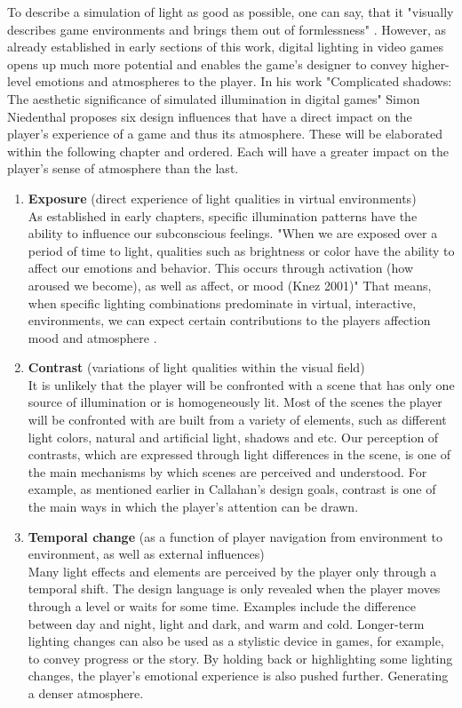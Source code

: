 To describe a simulation of light as good as possible, one can say, that it "visually describes game environments and brings them out of formlessness" \cite{Niedenthal1404353}. However, as already established in early sections of this work, digital lighting in video games opens up much more potential and enables the game's designer to convey higher-level emotions and atmospheres to the player. In his work "Complicated shadows: The aesthetic significance of simulated illumination in digital games" Simon Niedenthal proposes six design influences that have a direct impact on the player's experience of a game and thus its atmosphere. These will be elaborated within the following chapter and ordered. Each will have a greater impact on the player's sense of atmosphere than the last. 

\begin{enumerate}
    \item \textbf{Exposure} (direct experience of light qualities in virtual environments) \\
    As established in early chapters, specific illumination patterns have the ability to influence our subconscious feelings. "When we are exposed over a period of time to light, qualities such as brightness or color have the ability to affect our emotions and behavior. This occurs through activation (how aroused we become), as well as affect, or mood (Knez 2001)\cite{Knez2001}" That means, when specific lighting combinations predominate in virtual, interactive, environments, we can expect certain contributions to the players affection mood and atmosphere \cite{Shadowplay}.

    \item \textbf{Contrast} (variations of light qualities within the visual field)\\ 
    It is unlikely that the player will be confronted with a scene that has only one source of illumination or is homogeneously lit. Most of the scenes the player will be confronted with are built from a variety of elements, such as different light colors, natural and artificial light, shadows and etc. Our perception of contrasts, which are expressed through light differences in the scene, is one of the main mechanisms by which scenes are perceived and understood. For example, as mentioned earlier in Callahan's design goals, contrast is one of the main ways in which the player's attention can be drawn.  \cite{Storytelling}
    
    \item \textbf{Temporal change} (as a function of player navigation from environment to environment, as well as external influences) \\
    Many light effects and elements are perceived by the player only through a temporal shift. The design language is only revealed when the player moves through a level or waits for some time. Examples include the difference between day and night, light and dark, and warm and cold. Longer-term lighting changes can also be used as a stylistic device in games, for example, to convey progress or the story. By holding back or highlighting some lighting changes, the player's emotional experience is also pushed further. Generating a denser atmosphere. \cite{Niedenthal1404353}
    

\end{enumerate}
